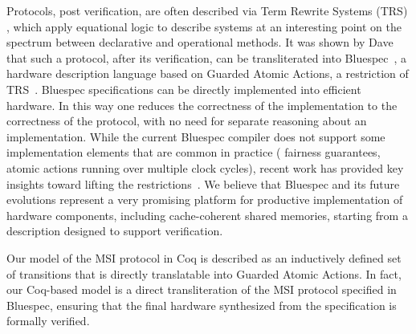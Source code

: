 Protocols, post verification, are often described via Term Rewrite Systems
(TRS) , which apply equational logic to describe
systems at an interesting point on the spectrum between declarative and
operational methods.  It was shown by Dave
\etal{}~\cite{DNA:CoherenceImplementation} that such a protocol, after its
verification, can be transliterated into Bluespec~\cite{Bluespec:TFRG}, a
hardware description language based on Guarded Atomic Actions, a restriction of
TRS~\cite{Hoe:TCAD}. Bluespec specifications can be directly implemented into
efficient hardware. In this way one reduces the correctness of the
implementation to the correctness of the protocol, with no need for separate
reasoning about an implementation. While the current Bluespec compiler does not
support some implementation elements that are common in practice (\eg{}
fairness guarantees, atomic actions running over multiple clock cycles), recent
work has provided key insights toward lifting the
restrictions~\cite{Karczmarek}. We believe that Bluespec and its future
evolutions represent a very promising platform for productive implementation of
hardware components, including cache-coherent shared memories, starting from a
description designed to support verification.

Our model of the MSI protocol
in Coq is described as an inductively defined set of transitions that is
directly translatable into Guarded Atomic Actions. In fact, our Coq-based model
is a direct transliteration of the MSI protocol specified in Bluespec,
ensuring that the final hardware synthesized from the specification is formally
verified.

%

